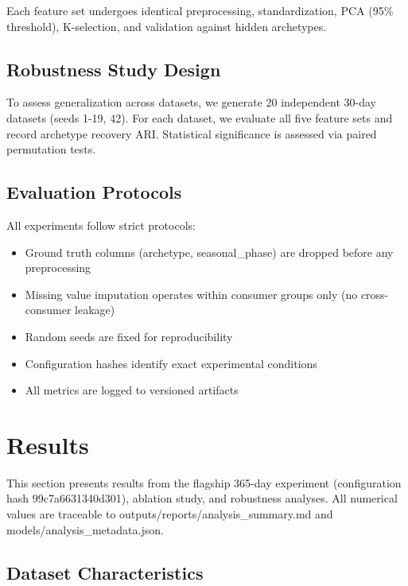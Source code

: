 \documentclass[11pt,a4paper]{article}
\begin{document}
Each feature set undergoes identical preprocessing, standardization, PCA (95\% threshold), K-selection, and validation against hidden archetypes.

\subsection{Robustness Study Design}

To assess generalization across datasets, we generate 20 independent 30-day datasets (seeds 1-19, 42). For each dataset, we evaluate all five feature sets and record archetype recovery ARI. Statistical significance is assessed via paired permutation tests.

\subsection{Evaluation Protocols}

All experiments follow strict protocols:

\begin{itemize}
    \item Ground truth columns (archetype, seasonal\_phase) are dropped before any preprocessing
    \item Missing value imputation operates within consumer groups only (no cross-consumer leakage)
    \item Random seeds are fixed for reproducibility
    \item Configuration hashes identify exact experimental conditions
    \item All metrics are logged to versioned artifacts
\end{itemize}

\section{Results}
\label{sec:results}

This section presents results from the flagship 365-day experiment (configuration hash 99c7a6631340d301), ablation study, and robustness analyses. All numerical values are traceable to outputs/reports/analysis\_summary.md and models/analysis\_metadata.json.

\subsection{Dataset Characteristics}
\end{document}
